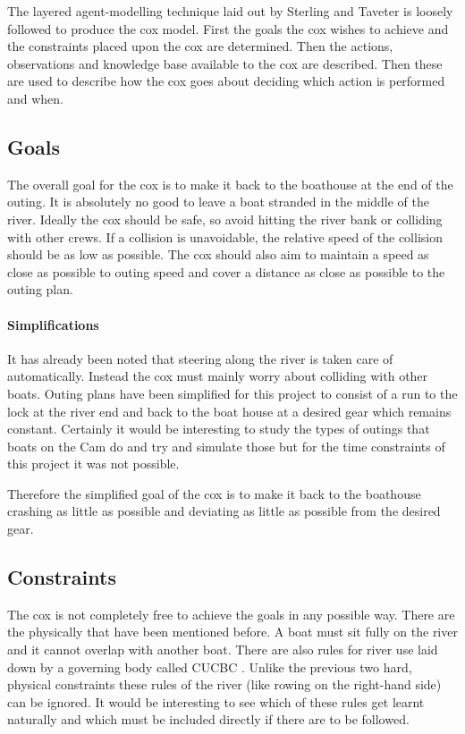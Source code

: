       The layered agent-modelling technique laid out by Sterling and Taveter \cite{Sterling2009} is loosely followed to produce the cox model. First the goals the cox wishes to achieve and the constraints placed upon the cox are determined. Then the actions, observations and knowledge base available to the cox are described. Then these are used to describe how the cox goes about deciding which action is performed and when.

      \subsection{Goals}
      The overall goal for the cox is to make it back to the boathouse at the end of the outing. It is absolutely no good to leave a boat stranded in the middle of the river. Ideally the cox should be safe, so avoid hitting the river bank or colliding with other crews. If a collision is unavoidable, the relative speed of the collision should be as low as possible. The cox should also aim to maintain a speed as close as possible to outing speed and cover a distance as close as possible to the outing plan.
      
      \paragraph{Simplifications}
      It has already been noted that steering along the river is taken care of automatically. Instead the cox must mainly worry about colliding with other boats. Outing plans have been simplified for this project to consist of a run to the lock at the river end and back to the boat house at a desired gear which remains constant. Certainly it would be interesting to study the types of outings that boats on the Cam do and try and simulate those but for the time constraints of this project it was not possible.
      
      Therefore the simplified goal of the cox is to make it back to the boathouse crashing as little as possible and deviating as little as possible from the desired gear.
      
      \subsection{Constraints} 
      The cox is not completely free to achieve the goals in any possible way. There are the physically that have been mentioned before. A boat must sit fully on the river and it cannot overlap with another boat. There are also rules for river use laid down by a governing body called CUCBC \cite{CUCBC}. Unlike the previous two hard, physical constraints these rules of the river (like rowing on the right-hand side) can be ignored. It would be interesting to see which of these rules get learnt naturally and which must be included directly if there are to be followed.

